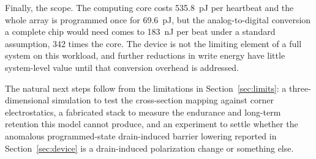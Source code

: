 Finally, the scope. The computing core costs \SI{535.8}{\pico\joule} per heartbeat and the
whole array is programmed once for \SI{69.6}{\pico\joule}, but the analog-to-digital
conversion a complete chip would need comes to \SI{183}{\nano\joule} per beat under a
standard assumption, \num{342} times the core. The device is not the limiting element of
a full system on this workload, and further reductions in write energy have little
system-level value until that conversion overhead is addressed.

The natural next steps follow from the limitations in Section~\ref{sec:limits}: a
three-dimensional simulation to test the cross-section mapping against corner
electrostatics, a fabricated stack to measure the endurance and long-term retention this
model cannot produce, and an experiment to settle whether the anomalous programmed-state
drain-induced barrier lowering reported in Section~\ref{sec:device} is a drain-induced
polarization change or something else.
